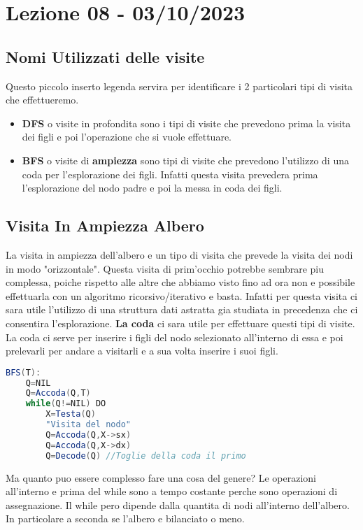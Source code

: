 \section{Lezione 08 - 03/10/2023}
\subsection{Nomi Utilizzati delle visite}
Questo piccolo inserto legenda servira per identificare i 2 particolari tipi di visita che effettueremo.
\begin{itemize}
	\item \textbf{DFS} o visite in profondita sono i tipi di visite che prevedono prima la visita dei figli e poi l'operazione che si vuole effettuare.
	\item \textbf{BFS} o visite di \textbf{ampiezza} sono tipi di visite che prevedono l'utilizzo di una coda per l'esplorazione dei figli. Infatti questa visita prevedera prima l'esplorazione del nodo padre e poi la messa in coda dei figli.
\end{itemize}

\subsection{Visita In Ampiezza Albero}
La visita in ampiezza dell'albero e un tipo di visita che prevede la visita dei nodi in modo "orizzontale". Questa visita di prim'occhio potrebbe sembrare piu complessa, poiche rispetto alle altre che abbiamo visto fino ad ora non e possibile effettuarla con un algoritmo ricorsivo/iterativo e basta. Infatti per questa visita ci sara utile l'utilizzo di una struttura dati astratta gia studiata in precedenza che ci consentira l'esplorazione. \textbf{La coda} ci sara utile per effettuare questi tipi di visite.
La coda ci serve per inserire i figli del nodo selezionato all'interno di essa e poi prelevarli per andare a visitarli e a sua volta inserire i suoi figli.

\begin{lstlisting}[language=Java]
	BFS(T):
	Q=NIL
	Q=Accoda(Q,T)
	while(Q!=NIL) DO
		X=Testa(Q)
		"Visita del nodo"
		Q=Accoda(Q,X->sx)
		Q=Accoda(Q,X->dx)
		Q=Decode(Q) //Toglie della coda il primo	
\end{lstlisting}

Ma quanto puo essere complesso fare una cosa del genere? Le operazioni all'interno e prima del while sono a tempo costante perche sono operazioni di assegnazione. Il while pero dipende dalla quantita di nodi all'interno dell'albero. In particolare a seconda se l'albero e bilanciato o meno.

